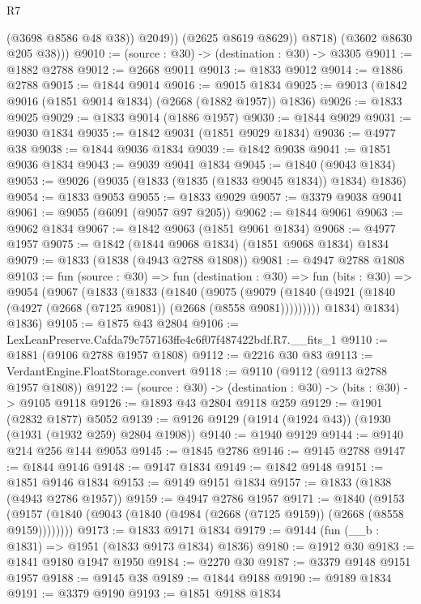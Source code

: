 \begin{lexlean}{R7}
\begin{coremodule}
                  (@3698 @8586 @48 @38))
                @2049))
            (@2625 @8619 @8629))
          @8718)
        (@3602 @8630 @205 @38)))
@9010 := (source : @30) -> (destination : @30) -> @3305
@9011 := @1882 @2788
@9012 := @2668 @9011
@9013 := @1833 @9012
@9014 := @1886 @2788
@9015 := @1844 @9014
@9016 := @9015 @1834
@9025 := @9013 (@1842 @9016 (@1851 @9014 @1834) (@2668 (@1882 @1957)) @1836)
@9026 := @1833 @9025
@9029 := @1833 @9014 (@1886 @1957)
@9030 := @1844 @9029
@9031 := @9030 @1834
@9035 := @1842 @9031 (@1851 @9029 @1834)
@9036 := @4977 @38
@9038 := @1844 @9036 @1834
@9039 := @1842 @9038
@9041 := @1851 @9036 @1834
@9043 := @9039 @9041 @1834
@9045 := @1840 (@9043 @1834)
@9053 := @9026 (@9035 (@1833 (@1835 (@1833 @9045 @1834)) @1834) @1836)
@9054 := @1833 @9053
@9055 := @1833 @9029
@9057 := @3379 @9038 @9041
@9061 := @9055 (@6091 (@9057 @97 @205))
@9062 := @1844 @9061
@9063 := @9062 @1834
@9067 := @1842 @9063 (@1851 @9061 @1834)
@9068 := @4977 @1957
@9075 := @1842 (@1844 @9068 @1834) (@1851 @9068 @1834) @1834
@9079 := @1833 (@1838 (@4943 @2788 @1808))
@9081 := @4947 @2788 @1808
@9103 := fun (source : @30) =>
  fun (destination : @30) =>
  fun (bits : @30) =>
  @9054
    (@9067
      (@1833
        (@1833
          (@1840
            (@9075
              (@9079 (@1840 (@4921 (@1840 (@4927 (@2668 (@7125 @9081)) (@2668 (@8558 @9081)))))))))
          @1834)
        @1834)
      @1836)
@9105 := @1875 @43 @2804
@9106 := LexLeanPreserve.Cafda79c757163ffe4c6f07f487422bdf.R7.__fits_1
@9110 := @1881 (@9106 @2788 @1957 @1808)
@9112 := @2216 @30 @83
@9113 := VerdantEngine.FloatStorage.convert
@9118 := @9110 (@9112 (@9113 @2788 @1957 @1808))
@9122 := (source : @30) -> (destination : @30) -> (bits : @30) -> @9105 @9118
@9126 := @1893 @43 @2804 @9118 @259
@9129 := @1901 (@2832 @1877) @5052
@9139 := @9126 @9129 (@1914 (@1924 @43)) (@1930 (@1931 (@1932 @259) @2804 @1908))
@9140 := @1940 @9129
@9144 := @9140 @214 @256 @144 @9053
@9145 := @1845 @2786
@9146 := @9145 @2788
@9147 := @1844 @9146
@9148 := @9147 @1834
@9149 := @1842 @9148
@9151 := @1851 @9146 @1834
@9153 := @9149 @9151 @1834
@9157 := @1833 (@1838 (@4943 @2786 @1957))
@9159 := @4947 @2786 @1957
@9171 := @1840
    (@9153 (@9157 (@1840 (@9043 (@1840 (@4984 (@2668 (@7125 @9159)) (@2668 (@8558 @9159))))))))
@9173 := @1833 @9171 @1834
@9179 := @9144 (fun (__b : @1831) => @1951 (@1833 @9173 @1834) @1836)
@9180 := @1912 @30
@9183 := @1841 @9180 @1947 @1950
@9184 := @2270 @30
@9187 := @3379 @9148 @9151 @1957
@9188 := @9145 @38
@9189 := @1844 @9188
@9190 := @9189 @1834
@9191 := @3379 @9190
@9193 := @1851 @9188 @1834

\end{coremodule}
\end{lexlean}
